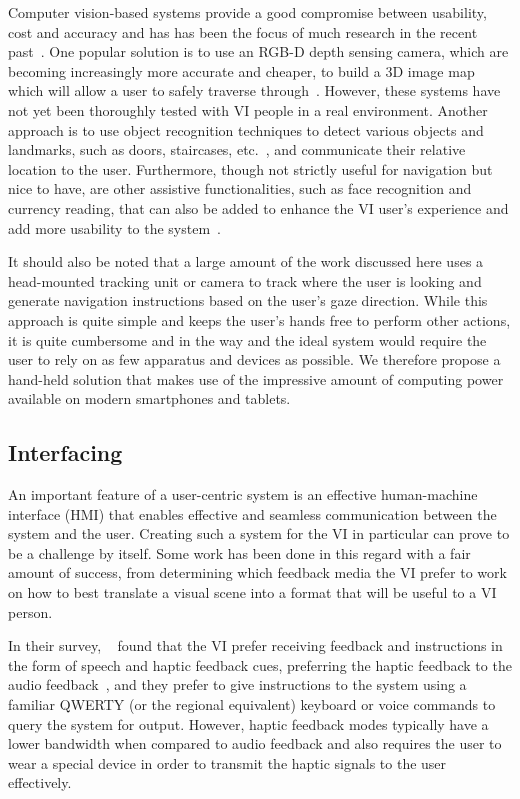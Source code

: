 \documentclass[format=sigconf, review=true, screen=true, anonymous=true]{acmart}
\begin{document}
Computer vision-based systems provide a good compromise between usability, cost and accuracy and has has been the focus of much research in the recent past~\cite{manduchi2014last}. One popular solution is to use an RGB-D depth sensing camera, which are becoming increasingly more accurate and cheaper, to build a 3D image map which will allow a user to safely traverse through~\cite{lee2015, rodriguez2012obstacle}. However, these systems have not yet been thoroughly tested with VI people in a real environment. Another approach is to use object recognition techniques to detect various objects and landmarks, such as doors, staircases, etc.~\cite{tian2013b}, and communicate their relative location to the user. Furthermore, though not strictly useful for navigation but nice to have, are other assistive functionalities, such as face recognition and currency reading, that can also be added to enhance the VI user's experience and add more usability to the system~\cite{chessa2016}.

It should also be noted that a large amount of the work discussed here uses a head-mounted tracking unit or camera to track where the user is looking and generate navigation instructions based on the user's gaze direction. While this approach is quite simple and keeps the user's hands free to perform other actions, it is quite cumbersome and in the way and the ideal system would require the user to rely on as few apparatus and devices as possible. We therefore propose a hand-held solution that makes use of the impressive amount of computing power available on modern smartphones and tablets. 

\subsection{Interfacing}

An important feature of a user-centric system is an effective human-machine interface (HMI) that enables effective and seamless communication between the system and the user. Creating such a system for the VI in particular can prove to be a challenge by itself. Some work has been done in this regard with a fair amount of success, from determining which feedback media the VI prefer to work on how to best translate a visual scene into a format that will be useful to a VI person. 

In their survey, \citeauthor{khoo2016multimodal}~\cite{khoo2016multimodal} found that the VI prefer receiving feedback and instructions in the form of speech and haptic feedback cues, preferring the haptic feedback to the audio feedback~\cite{ross2000wearable}, and they prefer to give instructions to the system using a familiar QWERTY (or the regional equivalent) keyboard or voice commands to query the system for output. However, haptic feedback modes typically have a lower bandwidth when compared to audio feedback and also requires the user to wear a special device in order to transmit the haptic signals to the user effectively. 
\end{document}

